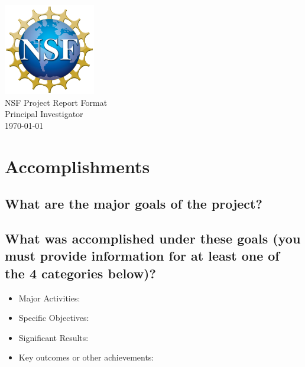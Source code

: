 \documentclass{article}
\begin{document}
\begin{titlepage}
\begin{center}
    \includegraphics[height=4cm,width=4cm]{NSF.png}\\
    \vspace{10mm} %
    \huge{NSF Project Report Format}\\
    \vspace{10mm} %
    \huge{Principal Investigator}\\
    \vspace{10mm} %
    \large{\today}
\end{center}
\end{titlepage}
\newpage
\newpage
\section*{Accomplishments}
\subsection*{What are the major goals of the project?}
\vspace{5mm}
\subsection*{What was accomplished under these goals (you must provide information for at least one of the 4 categories below)?}
\vspace{5mm}
\begin{itemize} 
\setlength{\itemsep}{5pt}
 \setlength{\parskip}{5pt}
 \setlength{\parsep}{5pt}
    \item[ ] Major Activities:\\
    \item[ ] Specific Objectives:\\
    \item[ ] Significant Results:\\
    \item[ ] Key outcomes or other achievements:\\
\end{itemize}
\end{document}
